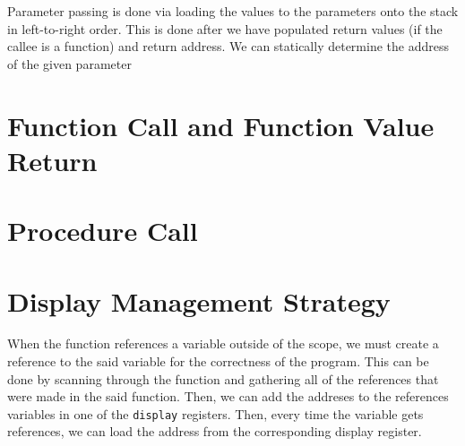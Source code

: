 \documentclass{article}
\begin{document}
Parameter passing is done via loading the values to the parameters onto the stack in left-to-right order. This is done after we have populated return values (if the callee is a function) and return address. We can statically determine the address of the given parameter 

\section{Function Call and Function Value Return}

\section{Procedure Call}

\section{Display Management Strategy} \label{display}

When the function references a variable outside of the scope, we must create a reference to the said variable for the correctness of the program. This can be done by scanning through the function and gathering all of the references that were made in the said function. Then, we can add the addreses to the references variables in one of the {\tt display} registers. Then, every time the variable gets references, we can load the address from the corresponding display register.

\end{document}
